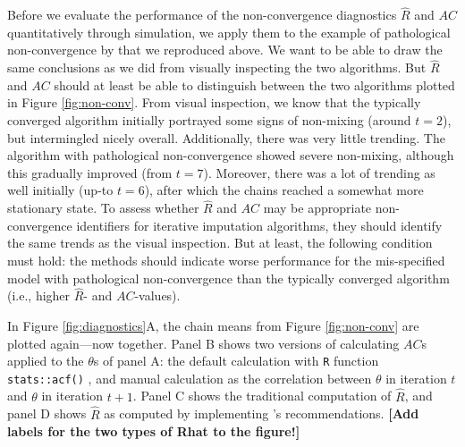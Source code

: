 \documentclass[Royal,times,sageh]{sagej}
\begin{document}
Before we evaluate the performance of the non-convergence diagnostics \(\widehat{R}\) and \(AC\) quantitatively through simulation, we apply them to the example of pathological non-convergence by \citet{buur18} that we reproduced above. We want to be able to draw the same conclusions as we did from visually inspecting the two algorithms. But \(\widehat{R}\) and \(AC\) should at least be able to distinguish between the two algorithms plotted in Figure \ref{fig:non-conv}. From visual inspection, we know that the typically converged algorithm initially portrayed some signs of non-mixing (around \(t=2\)), but intermingled nicely overall. Additionally, there was very little trending. The algorithm with pathological non-convergence showed severe non-mixing, although this gradually improved (from \(t=7\)). Moreover, there was a lot of trending as well initially (up-to \(t=6\)), after which the chains reached a somewhat more stationary state. To assess whether \(\widehat{R}\) and \(AC\) may be appropriate non-convergence identifiers for iterative imputation algorithms, they should identify the same trends as the visual inspection. But at least, the following condition must hold: the methods should indicate worse performance for the mis-specified model with pathological non-convergence than the typically converged algorithm (i.e., higher \(\widehat{R}\)- and \(AC\)-values).

In Figure \ref{fig:diagnostics}A, the chain means from Figure \ref{fig:non-conv} are plotted again---now together. Panel B shows two versions of calculating \(AC\)s applied to the \(\theta\)s of panel A: the default calculation with \texttt{R} function \texttt{stats::acf()} \citep{R}, and manual calculation as the correlation between \(\theta\) in iteration \(t\) and \(\theta\) in iteration \(t+1\). Panel C shows the traditional computation of \(\widehat{R}\), and panel D shows \(\widehat{R}\) as computed by implementing \citet{veht19} 's recommendations. \textbf{{[}Add labels for the two types of Rhat to the figure!{]}}
\end{document}
